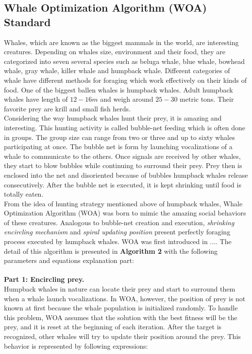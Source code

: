 \documentclass[a4paper]{article}
\begin{document}
\subsection{Whale Optimization Algorithm (WOA) Standard}
Whales, which are known as the biggest mammals in the world, are interesting creatures. Depending on whales size, environment and their food, they are categorized into seven several species such as beluga whale, blue whale, bowhead whale, gray whale, killer whale and humpback whale. Different categories of whale have different methods for foraging which work effectively on their kinds of food. One of the biggest ballen whales is humpback whales. Adult humpback whales have length of $12-16m$ and weigh around $25-30$ metric tons. Their favorite prey are krill and small fish herds. \\
Considering the way humpback whales hunt their prey, it is amazing and interesting. This hunting activity is called bubble-net feeding which is often done in groups. The group size can range from two or three and up to sixty whales participating at once. The bubble net is form by launching vocalizations of a whale to communicate to the others. Once signals are received by other whales, they start to blow bubbles while continuing to surround their prey. Prey then is enclosed into the net and disoriented because of bubbles humpback whales release consecutively. After the bubble net is executed, it is kept shrinking until food is totally eaten. \\
From the idea of hunting strategy mentioned above of humpback whales, Whale Optimization Algorithm (WOA) was born to mimic the amazing social behaviors of these creatures. Analogous to bubble-net creation and execution, \textit{shrinking encircling mechanism} and \textit{spiral updating position} present perfectly foraging process executed by humpback whales. WOA was first introduced in .... The detail of this algorithm is presented in \textbf{Algorithm 2} with the following parameters and equations explanation part: \\ \\  
\textbf{Part 1: Encircling prey.} \\
Humpback whales in nature can locate their prey and start to surround them when a whale launch vocalizations. In WOA, however, the position of prey is not known at first because the whale population is initialized randomly. To handle this problem, WOA assumes that the solution with the best fitness will be the prey, and it is reset at the beginning of each iteration. After the target is recognized, other whales will try to update their position around the prey. This behavior is represented by following expressions: \\ \\
\end{document}
